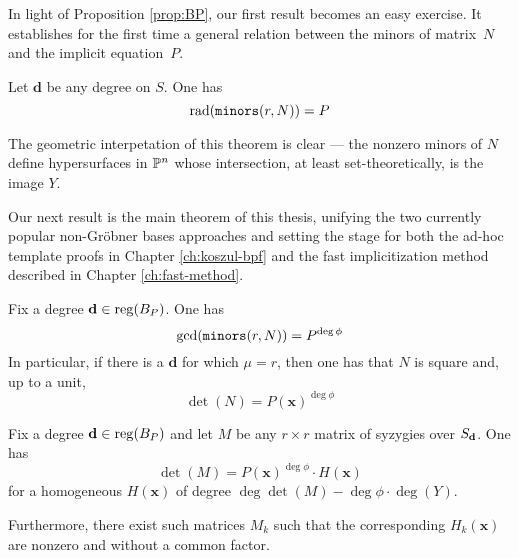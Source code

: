 \documentclass[fleqn,reqno]{amsart}
\numberwithin{first}{chapter}
\begin{document}
\begin{paragraf*}
In light of Proposition \ref{prop:BP}, our first result becomes an easy exercise.
It establishes for the first time a general relation between the minors of matrix~$N$
and the implicit equation~$P$.
\end{paragraf*}

\begin{theorem}
\label{thm:rad-minors}
Let $\mathbf d$ be any degree on $S$. One has
\[
\operatorname{rad}(\mathop{\tt minors}(r,N))=P
\]
\end{theorem}

\begin{paragraf*}
The geometric interpetation of this theorem is clear ---
the nonzero minors of $N$ define hypersurfaces in $\mathbb{P}^n$ whose intersection,
at least set-theoretically, is the image $Y$.
\end{paragraf*}

\begin{paragraf*}
Our next result is the main theorem of this thesis, unifying the two currently
popular non-Gr\"{o}bner bases approaches and setting the stage for both
the ad-hoc template proofs in Chapter \ref{ch:koszul-bpf} and
the fast implicitization method described in Chapter \ref{ch:fast-method}.
\end{paragraf*}

\begin{theorem}
\label{thm:gcd-minors}
Fix a degree $\mathbf d\in\operatorname{reg}(B_P)$. One has
\[
	\gcd(\mathop{\tt minors}(r, N))=P^{\deg\phi}
\]
In particular, if there is a $\mathbf d$ for which $\mu=r$,
then one has that $N$ is square and, up to a unit,
\[
	\det(N)=P(\mathbf x)^{\deg\phi}
\]
\end{theorem}

\begin{corollary}
\label{thm:detM}
Fix a degree $\mathbf d\in\operatorname{reg}(B_P)$ and let $M$ be any $r\times r$ matrix of syzygies over $S_\mathbf d$. One has
\[
	\det(M)=P(\mathbf x)^{\deg\phi}\cdot H(\mathbf x)
\]
for a homogeneous $H(\mathbf x)$ of degree $\deg\det(M)-\deg\phi\cdot\deg(Y)$.

Furthermore, there exist such matrices $M_k$ such that the corresponding $H_k(\mathbf x)$
are nonzero and without a common factor.
\end{corollary}
\end{document}
